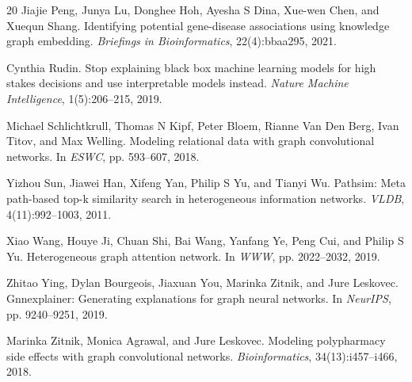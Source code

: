 \documentclass{article}
\begin{document}
\begin{thebibliography}{20}
Jiajie Peng, Junya Lu, Donghee Hoh, Ayesha S Dina, Xue-wen Chen, and Xuequn Shang.
\newblock Identifying potential gene-disease associations using knowledge graph embedding.
\newblock \emph{Briefings in Bioinformatics}, 22(4):bbaa295, 2021.

Cynthia Rudin.
\newblock Stop explaining black box machine learning models for high stakes decisions and use interpretable models instead.
\newblock \emph{Nature Machine Intelligence}, 1(5):206--215, 2019.

Michael Schlichtkrull, Thomas N Kipf, Peter Bloem, Rianne Van Den Berg, Ivan Titov, and Max Welling.
\newblock Modeling relational data with graph convolutional networks.
\newblock In \emph{ESWC}, pp. 593--607, 2018.

Yizhou Sun, Jiawei Han, Xifeng Yan, Philip S Yu, and Tianyi Wu.
\newblock Pathsim: Meta path-based top-k similarity search in heterogeneous information networks.
\newblock \emph{VLDB}, 4(11):992--1003, 2011.

Xiao Wang, Houye Ji, Chuan Shi, Bai Wang, Yanfang Ye, Peng Cui, and Philip S Yu.
\newblock Heterogeneous graph attention network.
\newblock In \emph{WWW}, pp. 2022--2032, 2019.

Zhitao Ying, Dylan Bourgeois, Jiaxuan You, Marinka Zitnik, and Jure Leskovec.
\newblock Gnnexplainer: Generating explanations for graph neural networks.
\newblock In \emph{NeurIPS}, pp. 9240--9251, 2019.

Marinka Zitnik, Monica Agrawal, and Jure Leskovec.
\newblock Modeling polypharmacy side effects with graph convolutional networks.
\newblock \emph{Bioinformatics}, 34(13):i457--i466, 2018.

\end{thebibliography}
\end{document}
